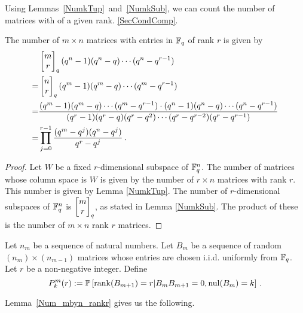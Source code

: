 Using Lemmas~\ref{NumkTup}~and~\ref{NumkSub}, we can count the number of matrices
with of a given rank. %
\ref{SecCondComp}.

\begin{lemma}\label{Num_mbyn_rankr}
The number of $m\times n$ matrices with entries in $\mathbb{F}_q$ of rank $r$ is given by
\begin{align*}
	&\begin{bmatrix}{m}\\ {r}\end{bmatrix}_q(q^n-1)(q^n-q)\cdots (q^n-q^{r-1})\\
   =& \begin{bmatrix}{n}\\ {r}\end{bmatrix}_q(q^m-1)(q^m-q)\cdots (q^m-q^{r-1})\\
   =& \frac{(q^m-1) (q^m-q) \cdots (q^m-q^{r-1})\cdot
            (q^n-1) (q^n-q) \cdots (q^n-q^{r-1})}
      {(q^r-1)(q^r - q)(q^r - q^2)\cdots (q^r - q^{r-2})(q^r-q^{r-1})} \\
      =& \prod_{j=0}^{r-1} \frac{(q^m-q^j) (q^n - q^j)}{q^r - q^j} \, .
\end{align*}
\end{lemma}

\begin{proof}
  Let $W$ be a fixed $r$-dimensional subspace of $\mathbb{F}_q^{n}$.  The number of
  matrices whose column space is $W$ is given by the number of $r\times n$
  matrices with rank $r$.  This number is given by Lemma \ref{NumkTup}. The
  number of $r$-dimensional subspaces of $\mathbb{F}_q^{n}$ is $\begin{bmatrix}{m}\\ {r}\end{bmatrix}_q$, as stated
  in Lemma \ref{NumkSub}.  The product of these is the number of $m\times n$
  rank $r$ matrices.
\end{proof}


\begin{definition}\label{defPkmr}
Let $n_m$ be a sequence of natural numbers. Let $B_m$ be a sequence of random $(n_m) \times (n_{m-1})$ matrices whose entries are chosen i.i.d. uniformly from $\mathbb{F}_q$. Let $r$ be a non-negative integer.  Define 
\[
  P^m_k(r) := \mathbb{P} 
  \left[\operatorname{\mathrm{rank}}(B_{m+1}) = r|B_{m}B_{m+1} = 0, \mathrm{nul}(B_{m}) = k \right] \, .
\]
\end{definition}


Lemma~\ref{Num_mbyn_rankr} gives us the following.

